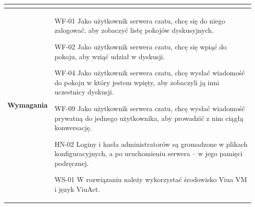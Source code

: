 \begin{tabular}{ | l | l | }
{    	} \\

    \hline
    \parbox[t]{3cm}{
    	\textbf{Wymagania}
    } & \parbox[t]{12cm}{\strut
      \begin{labreq}
          \item[WF-01] Jako użytkownik serwera czatu, chcę się do
          niego zalogować, aby zobaczyć listę pokojów dyskusyjnych.
          \item[WF-02] Jako użytkownik serwera czatu, chcę się
          wpiąć do pokoju, aby wziąć udział w dyskusji.
          \item[WF-04] Jako użytkownik serwera czatu, chcę wysłać wiadomość do pokoju w który jestem wpięty, aby zobaczyli ją inni uczestnicy dyskusji.
          \item[WF-09] Jako użytkownik serwera czatu, chcę wysłać
          wiadomość prywatną do jednego użytkownika, aby prowadzić
          z nim ciągłą konwersację.
          \item[HN-02] Loginy i hasła administratorów są gromadzone
          w plikach konfiguracyjnych, a po uruchomieniu serwera --
          w jego pamięci podręcznej.
          \item[WS-01] W rozwiązaniu należy wykorzystać środowisko Viua VM i język ViuAct.
      \end{labreq}
      \strut} \\

    \hline
\end{tabular}

\vspace{1em}


